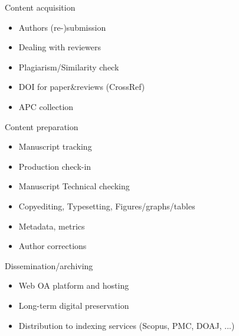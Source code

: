 \documentclass[10pt,compress,serif,aspectratio=169]{beamer}
\begin{document}
\begin{frame}[t]%
 \vskip1cm%

   Content acquisition
   \begin{itemize}
   \item Authors (re-)submission
   \item Dealing with reviewers
   \item Plagiarism/Similarity check
   \item DOI for paper\&reviews (CrossRef)
   \item APC collection
   \end{itemize}
   \pause
   Content preparation
   \begin{itemize}
   \item Manuscript tracking
   \item Production check-in
   \item Manuscript Technical checking
   \item Copyediting, Typesetting, Figures/graphs/tables
   \item Metadata, metrics
   \item Author corrections
   \end{itemize}
   \pause
   Dissemination/archiving
   \begin{itemize}
   \item Web OA platform and hosting
   \item Long-term digital preservation
   \item Distribution to indexing services (Scopus, PMC, DOAJ, ...)
   \end{itemize}
\end{frame}





\begin{frame}[t]%
 \vskip1cm%
 \begin{center}%
 \end{center}%
\end{frame}
 
\end{document}
